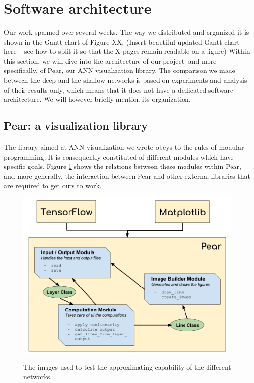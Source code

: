 \documentclass[a4paper]{article}
\begin{document}
\section{Software architecture}
\paragraph{}Our work spanned over several weeks. The way we distributed and organized it is shown in the Gantt chart of Figure XX. (Insert beautiful updated Gantt chart here -- see how to split it so that the X pages remain readable on a figure) Within this section, we will dive into the architecture of our project, and more specifically, of Pear, our ANN visualization library. The comparison we made between the deep and the shallow networks is based on experiments and analysis of their results only, which means that it does not have a dedicated software architecture. We will however briefly mention its organization.

\subsection{Pear: a visualization library}

\paragraph{}The library aimed at ANN visualization we wrote obeys to the rules of modular programming. It is consequently constituted of different modules which have specific goals. Figure \ref{fig:modules} shows the relations between these modules within Pear, and more generally, the interaction between Pear and other external libraries that are required to get ours to work.

\begin{figure}[h]
\centering
\includegraphics[scale=0.3]{images/Modules.png}
\label{fig:modules}
\caption{The images used to test the approximating capability of the different networks.}
\end{figure}
\end{document}

